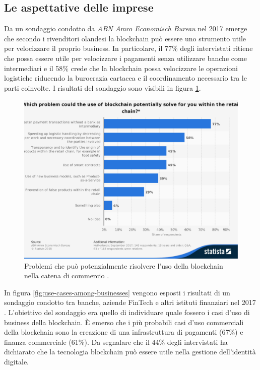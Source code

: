 \subsection{Le aspettative delle imprese}

Da un sondaggio condotto da \textit{ABN Amro Economisch Bureau} nel 2017 \cite{potential-blockchain-applications}
emerge che secondo i rivenditori olandesi la blockchain può essere uno strumento
utile per velocizzare il proprio business. In particolare,
il 77\% degli intervistati ritiene che possa essere utile per velocizzare
i pagamenti senza utilizzare banche come intermediari e il 58\% crede che
la blockchain possa velocizzare le operazioni logistiche riducendo la burocrazia cartacea
e il coordinamento necessario tra le parti coinvolte.
I risultati del sondaggio sono visibili in figura \ref{fig:potential-blockchain-applications}.
\begin{figure}[H]
	\centering
	\includegraphics[width=.6\linewidth]{images/chap_intro/potential-blockchain-applications.pdf}
	\caption{Problemi che può potenzialmente risolvere l'uso della blockchain
		nella catena di commercio \cite{potential-blockchain-applications}.}
	\label{fig:potential-blockchain-applications}
\end{figure}

In figura \ref{fig:use-cases-among-businesses} vengono esposti i risultati di un sondaggio
condotto tra banche, aziende FinTech e altri istituti finanziari nel 2017 \cite{use-cases-among-businesses}.
L'obiettivo
del sondaggio era quello di individuare quale fossero i casi d'uso di business
della blockchain. È emerso che i più probabili casi d'uso commerciali della blockchain
sono la creazione di una infrastruttura di pagamenti (67\%) e finanza commerciale (61\%).
Da segnalare che il 44\% degli intervistati ha dichiarato che
la tecnologia blockchain può essere utile nella gestione dell'identità digitale.

